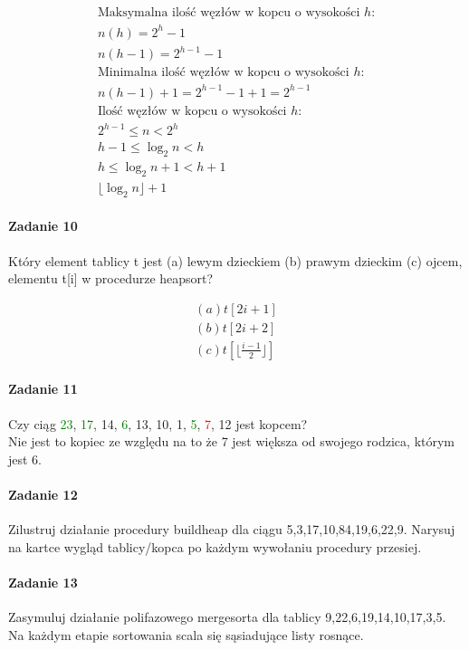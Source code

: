 \documentclass[18pt]{extarticle}
\begin{document}
\begin{gather*}
    \text{Maksymalna ilość węzłów w kopcu o wysokości $h$:} \\
    n(h) = 2^h - 1 \\
    n(h-1) = 2^{h - 1} - 1 \\
    \text{Minimalna ilość węzłów w kopcu o wysokości $h$:} \\
    n(h-1) + 1 = 2^{h - 1} - 1 + 1 = 2^{h - 1} \\
    \text{Ilość węzłów w kopcu o wysokości $h$:} \\
    2^{h - 1} \leq n < 2^h \\
    h-1 \leq \log_2 n < h \\
    h \leq \log_2 n + 1 < h + 1 \\
    \lfloor\log_2 n\rfloor + 1
\end{gather*}

\paragraph{Zadanie 10} Który element tablicy t jest (a) lewym dzieckiem (b) prawym dzieckim (c) ojcem, elementu t[i] w procedurze heapsort?

\begin{gather*}
    (a) t[2i+1] \\
    (b) t[2i+2] \\
    (c) t[\lfloor\frac{i-1}{2}\rfloor]
\end{gather*}


\paragraph{Zadanie 11} Czy ciąg {\textcolor{green}{23}, \textcolor{green}{17}, 14, \textcolor{green}{6}, 13, 10, 1, \textcolor{green}{5}, \textcolor{red}{7}, 12} jest kopcem? \\

Nie jest to kopiec ze względu na to że 7 jest większa od swojego rodzica, którym jest 6. \\ 

\paragraph{Zadanie 12} Zilustruj działanie procedury buildheap dla ciągu {5,3,17,10,84,19,6,22,9}. Narysuj na kartce wygląd tablicy/kopca po każdym wywołaniu procedury przesiej.

\paragraph{Zadanie 13} Zasymuluj działanie polifazowego mergesorta dla tablicy {9,22,6,19,14,10,17,3,5}. Na każdym etapie sortowania scala się sąsiadujące listy rosnące.
\end{document}
